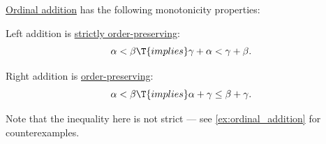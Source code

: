 \begin{proposition}\label{thm:ordinal_addition_is_monotone}
  \hyperref[def:ordinal_arithmetic/addition]{Ordinal addition} has the following monotonicity properties:
  \begin{thmenum}
     Left addition is \hyperref[eq:def:order_function/preserving/strict]{strictly order-preserving}:
    \begin{equation}\label{eq:thm:ordinal_addition_is_monotone/left}
      \alpha < \beta \T{implies} \gamma + \alpha < \gamma + \beta.
    \end{equation}

     Right addition is \hyperref[def:order_function/preserving]{order-preserving}:
    \begin{equation}\label{eq:thm:ordinal_addition_is_monotone/right}
      \alpha < \beta \T{implies} \alpha + \gamma \leq \beta + \gamma.
    \end{equation}

    Note that the inequality here is not strict --- see \cref{ex:ordinal_addition} for counterexamples.
  \end{thmenum}
\end{proposition}
